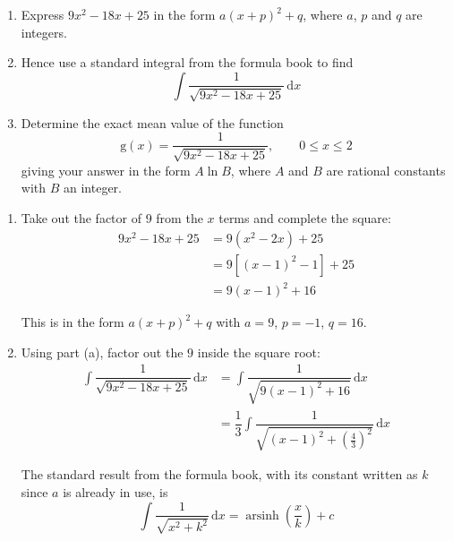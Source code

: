 \documentclass[leqno]{article}
\begin{document}
\begin{enumerate}[
  label=\textbf{\arabic*.},
  leftmargin=*,
  topsep=0pt,
  partopsep=0pt,
  parsep=0pt
]
\begin{djsSolution}
\begin{enumerate}[label=\textbf{(\alph*)}, start=1]
\end{enumerate}
\end{djsSolution}

\newpage

\questionitem

\begin{enumerate}[label=\textbf{(\alph*)}]
  \item Express $9x^2 - 18x + 25$ in the form $a(x+p)^2 + q$, where $a$, $p$ and $q$ are integers.  \\
  \item Hence use a standard integral from the formula book to find
  \[\int \dfrac{1}{\sqrt{9x^2 - 18x + 25}}\,\mathrm{d}x\] 
  \item Determine the exact mean value of the function
  \[\mathrm{g}(x) = \dfrac{1}{\sqrt{9x^2 - 18x + 25}}, \qquad 0 \le x \le 2\]
  giving your answer in the form $A \ln B$, where $A$ and $B$ are rational constants with $B$ an integer.  \\
\end{enumerate}

\vspace*{10pt}

\begin{djsSolution}
\begin{enumerate}[label=\textbf{(\alph*)}, start=1]
  \item Take out the factor of \(9\) from the \(x\) terms and complete the square:
\begin{align*}
9x^2-18x+25&=9\left(x^2-2x\right)+25\\
&=9\left[(x-1)^2-1\right]+25\\
&=9(x-1)^2+16
\end{align*}

This is in the form \(a(x+p)^2+q\) with \(a=9\), \(p=-1\), \(q=16\).

  \item Using part (a), factor out the \(9\) inside the square root:
\begin{align*}
\int \dfrac{1}{\sqrt{9x^2-18x+25}}\,\mathrm{d}x&=\int \dfrac{1}{\sqrt{9(x-1)^2+16}}\,\mathrm{d}x\\
&=\dfrac{1}{3}\int \dfrac{1}{\sqrt{(x-1)^2+\left(\frac{4}{3}\right)^2}}\,\mathrm{d}x
\end{align*}

The standard result from the formula book, with its constant written as \(k\) since \(a\) is already in use, is
\[
\int \dfrac{1}{\sqrt{x^2+k^2}}\,\mathrm{d}x=\operatorname{arsinh}\left(\dfrac{x}{k}\right)+c
\]


\end{enumerate}
\end{djsSolution}
\end{enumerate}
\end{document}
